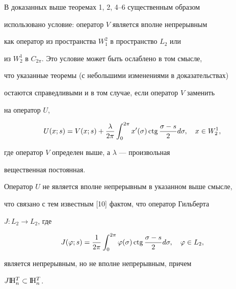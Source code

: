 \begin{note}


В доказанных выше теоремах 1, 2, 4--6 существенным образом


использовано условие: оператор $V$ является вполне непрерывным


как оператор из пространства $W^2_1$ в пространство $L_2$ или


из $W^1_2$ в $C_{2\pi}$. Это условие может быть ослаблено в том смысле,


что указанные теоремы (с небольшими изменениями в доказательствах)


остаются справедливыми и в том случае, если оператор $V$ заменить


на оператор $U$,


$$


U(x;s)=V(x;s)+\frac{\lambda}{2\pi}


\int^{2\pi}_0 x'(\sigma)\ctg\frac{\sigma-s}{2}d\sigma,


\quad x\in W^1_2,


$$


где оператор $V$ определен выше, а $\lambda$ --- произвольная


вещественная постоянная.





Оператор $U$ не является вполне непрерывным в указанном выше смысле,


что связано с тем известным [10] фактом, что оператор Гильберта


$J:L_2\to L_2$, где


$$


J(\varphi;s)=\frac{1}{2\pi}\int^{2\pi}_0


\varphi(\sigma)\ctg\frac{\sigma-s}{2}d\sigma,\quad


\varphi\in L_2,


$$


является непрерывным, но не вполне непрерывным, причем


$J\mathrm I \!\mathrm H_n^T\subset \mathrm I \!\mathrm H_n^T$.


\end{note}





